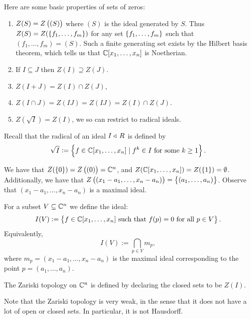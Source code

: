 \documentclass[11pt,a4paper]{article}
\begin{document}
\begin{proposition}
  Here are some basic properties of sets of zeros:
  \begin{enumerate}
    \item[(1)] $Z(S) = Z\del{(S)}$ where $(S)$ is the ideal generated by $S$.
      Thus $Z(S) = Z(\left\{f_1,\dots,f_m\right\})$ for any set $\left\{f_1,\dots,f_m\right\}$
      such that $(f_1,\dots,f_m) = (S)$.
      Such a finite generating set exists by the Hilbert basis theorem,
      which tells us that $\mathbb{C}[x_1,\dots,x_n]$ is Noetherian.
    \item[(2)] If $I \subseteq J$ then $Z(I) \supseteq Z(J)$.
    \item[(3)] $Z(I + J) = Z(I) \cap Z(J)$,
    \item[(4)] $Z(I \cap J) = Z(IJ) = Z(IJ) = Z(I) \cap Z(J)$.
    \item[(5)] $Z(\sqrt{I}) = Z(I)$,
      we so can restrict to radical ideals.
  \end{enumerate}
\end{proposition}

\begin{remark}
  Recall that the radical of an ideal $I \triangleleft\, R$ is defined by
  \[
    \sqrt{I} :=
    \left\{f \in \mathbb{C}[x_1,\dots,x_n] \mid f^k \in I \text{ for some } k \geq 1\right\}.
  \]
\end{remark}

\begin{example}
  We have that $Z(\set{0}) = Z\del{(0)} = \C^n$,
  and $Z(\mathbb{C}[x_1,\dots,x_n]) = Z(\left\{1\right\}) = \emptyset$.
  Additionally,
  we have that $Z\del{(x_1-a_1,\dots,x_n-a_n)} = \set{(a_1,\dots,a_n)}$.
  Observe that $(x_1-a_1,\dots,x_n-a_n)$ is a maximal ideal.
\end{example}

\begin{definition}
  For a subset $V \subseteq \mathbb{C}^n$ we define the ideal:
  \[
    I(V) :=
    \left\{f \in \mathbb{C}[x_1,\dots,x_n] \text{ such that $f(p) = 0$ for all $p \in V$}\right\}.
  \]
  Equivalently,
  \[
    I(V) :=
    \bigcap_{p \in V} m_p,
  \]
  where $m_p = (x_1-a_1,\dots,x_n-a_n)$ is the maximal ideal corresponding
  to the point $p = (a_1,\dots,a_n)$.
\end{definition}

\begin{definition}
  The Zariski topology on $\mathbb{C}^n$ is defined by declaring the closed sets
  to be $Z(I)$.
\end{definition}

\begin{remark}
  Note that the Zariski topology is very weak,
  in the sense that it does not have a lot of open or closed sets.
  In particular, it is not Hausdorff.
\end{remark}
\end{document}
